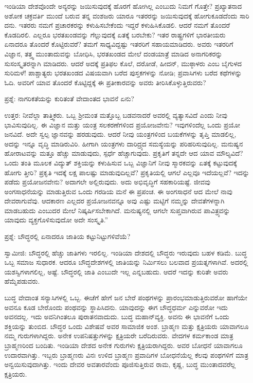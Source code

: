 ಇಂಡಿಯಾ ದೇಶವೊಂದೇ ಅನ್ಯರನ್ನು ಜಯಿಸುವುದಕ್ಕೆ ಹೊರಗೆ ಹೋಗಿಲ್ಲ ಎಂಬುದು ನಿಮಗೆ ಗೊತ್ತೇ? ಪ್ರಖ್ಯಾತನಾದ ಅಶೋಕ ಚಕ್ರವರ್ತಿ ಮುಂದೆ ಬರುವ ತನ್ನ ವಂಶಜರು ಯಾರೂ ಇತರರನ್ನು ಜಯಿಸುವುದಕ್ಕೆ ಹೋಗುಕೂಡದೆಂದು ಸಾರಿ ದನು. ಇತರರು ನಮಗೆ ಪ್ರಚಾರಕರನ್ನು ಕಳುಹಿಸಬೇಕೆಂದು ಇದ್ದರೆ ಕಳುಹಿಸಿಕೊಡಲಿ. ಆದರೆ ನಮಗೆ ತೊಂದರೆ ಕೊಡದಿರಲಿ. ಎಲ್ಲರೂ ಭರತಖಂಡವನ್ನು ಗೆಲ್ಲುವುದಕ್ಕೆ ಏತಕ್ಕೆ ಬರಬೇಕು? ಇತರ ರಾಷ್ಟ್ರಗಳಿಗೆ ಭಾರತೀಯರು ಏನಾದರೂ ತೊಂದರೆ ಕೊಟ್ಟಿರುವರೆ? ತಮಗೆ ಸಾಧ್ಯವಿದ್ದಷ್ಟು ಇತರರಿಗೆ ಸಹಾಯಮಾಡಿದರು. ಅವರು ಇತರರಿಗೆ ವಿಜ್ಞಾನ, ತತ್ತ್ವ ಮುಂತಾದುವನ್ನು ಬೋಧಿಸಿ, ಭರತಖಂಡದ ಮೇಲೆ ದಂಡಯಾತ್ರೆ ಮಾಡಿದ ಅನಾಗರಿಕರನ್ನು ಸುಸಂಸ್ಕೃತರನ್ನಾಗಿ ಮಾಡಿದರು. ಆದರೆ ಅದಕ್ಕೆ ಪ್ರತಿಫಲ ಕೊಲೆ, ದರೋಡೆ, ಹೀದನ್​, ಮುಠ್ಠಾಳರು ಎಂಬ ಬೈಗುಳದ ಸುರಿಮಳೆ! ಪಾಶ್ಚಾತ್ಯರು ಭರತಖಂಡದ ವಿಷಯವಾಗಿ ಬರೆದ ಪುಸ್ತಕಗಳನ್ನು ನೋಡಿ; ಪ್ರವಾಸಿಗಳು ಬರೆದ ಕಥೆಗಳನ್ನು ಓದಿ. ಅವರಿಗೆ ಯಾವ ತೊಂದರೆ ಕೊಟ್ಟಿದ್ದಕ್ಕೆ ಈ ಪ್ರತೀಕಾರವನ್ನು ಅವರು ತೀರಿಸಿಕೊಳ್ಳುತ್ತಿರುವರು?

ಪ್ರಶ್ನೆ: ನಾಗರಿಕತೆಯನ್ನು ಕುರಿತಂತೆ ವೇದಾಂತದ ಭಾವನೆ ಏನು?

ಉತ್ತರ: ನೀವೆಲ್ಲಾ ತಾತ್ತ್ವಿಕರು. ಒಬ್ಬ ಶ‍್ರೀಮಂತ ಮತ್ತೊಬ್ಬ ಬಡವನಾದರೆ ಅವರಲ್ಲಿ ವ್ಯತ್ಯಾಸವಿದೆ ಎಂದು ನೀವು ಭಾವಿಸುವುದಿಲ್ಲ. ಈ ವಿಜ್ಞಾನ ಮತ್ತು ಯಂತ್ರ ಸಲಕರಣೆಗಳಿಂದ ಪ್ರಯೋಜವೇನು? ಇವುಗಳಿಂದೆಲ್ಲ ಒಂದು ಪ್ರಯೋ ಜನವಿದೆ. ಅದೇ ಸ್ವಲ್ಪ ಜ್ಞಾನವನ್ನು ಹರಡುವುದು. ಆದರೆ ನೀವು ಯಂತ್ರಗಳಿಂದ ಬಯಕೆಗಳನ್ನು ತೃಪ್ತಿ ಮಾಡಲಿಲ್ಲ, ಅದನ್ನು ಇನ್ನೂ ವೃದ್ಧಿ ಮಾಡಿರುವಿರಿ. ಹೀಗಾಗಿ ಯಂತ್ರಗಳು ದಾರಿದ್ರ್ಯದ ಸಮಸ್ಯೆಯನ್ನು ಪರಿಹರಿಸುವುದಿಲ್ಲ. ಮನುಷ್ಯನ ಹೋರಾಟವನ್ನು ಮತ್ತೂ ಹೆಚ್ಚು ಮಾಡುವುದು, ಸ್ಪರ್ಧೆ ಹೆಚ್ಚಾಗುವುದು. ಪ್ರಕೃತಿಗೆ ತನ್ನದೇ ಆದ ಯಾವ ಮೌಲ್ಯವಿದೆ? ಒಂದು ತಂತಿ ಮೂಲಕ ವಿದ್ಯುತ್​ ಶಕ್ತಿಯನ್ನು ಕಳುಹಿಸುವ ಒಬ್ಬ ವಿಜ್ಞಾನಿಗೆ ನೀವು ಸ್ಮಾರಕವನ್ನು ಏತಕ್ಕೆ ಕಟ್ಟುವುದಕ್ಕೆ ಹೋಗು ತ್ತೀರಿ? ಪ್ರಕೃತಿ ಇದಕ್ಕೆ ಲಕ್ಷ ಪಾಲಷ್ಟು ಮಾಡುವುದಿಲ್ಲವೆ? ಪ್ರಕೃತಿಯಲ್ಲಿ ಆಗಲೆ ಎಲ್ಲವೂ ಇದೆಯಲ್ಲವೆ? ಇದನ್ನು ಪಡೆದು ಪ್ರಯೋಜನವೇನು? ಅದಾಗಲೇ ಅಲ್ಲಿರುವುದು. ಅದು ಅಭಿವೃದ್ಧಿಗೆ ಸಹಕಾರಿಯಷ್ಟೆ. ಜೀವವು ಅಂಗಸಾಧನೆಯನ್ನು ಮಾಡುತ್ತಿರುವ ಒಂದು ಗರಡಿಯ ಮನೆ ಈ ಪ್ರಪಂಚ. ಈ ಅಂಗಸಾಧನೆ ಆದ ಮೇಲೆ ನಾವು ದೇವರಾಗುವೆವು. ಆದಕಾರಣ ಎಲ್ಲದರ ಪ್ರಯೋಜನವನ್ನೂ ಅವು ಎಷ್ಟು ಮಟ್ಟಿಗೆ ನಮ್ಮನ್ನು ದೇವತೆಗಳನ್ನಾಗಿ ಮಾಡಬಹುದು ಎಂಬುದರ ಮೇಲೆ ನಿಷ್ಕರ್ಷಿಸಬೇಕಾಗಿದೆ. ಮನುಷ್ಯನಲ್ಲಿ ಆಗಲೇ ಸುಪ್ತವಾಗಿರುವ ಪಾವಿತ್ರ್ಯವನ್ನು ಯಾವುದು ವ್ಯಕ್ತಗೊಳಿಸುವುದೋ ಅದೇ ಸಂಸ್ಕೃತಿ.”

ಪ್ರಶ್ನೆ: ಬೌದ್ಧರಲ್ಲಿ ಏನಾದರೂ ಜಾತಿಯ ಕಟ್ಟುನಿಟ್ಟುಗಳಿವೆಯೆ?

ಸ್ವಾಮೀಜಿ: ಬೌದ್ಧರಲ್ಲಿ ಹೆಚ್ಚು ಜಾತಿಗಳು ಇರಲಿಲ್ಲ. ಇಂಡಿಯಾ ದೇಶದಲ್ಲಿ ಬೌದ್ಧರು ಇರುವುದು ಬಹಳ ಕಡಿಮೆ. ಬುದ್ಧ ಒಬ್ಬ ಸಮಾಜ ಸುಧಾರಕ. ಆದರೂ ಬೌದ್ಧದೇಶಗಳಲ್ಲಿ ಜಾತಿಯನ್ನು ನಿರ್ಮಿಸಲು ಬಲವಾದ ಪ್ರಯತ್ನಗಳಾಗಿವೆ. ಅದರಲ್ಲಿ ಯಶಸ್ವಿಗಳಾಗಲಿಲ್ಲ, ಅಷ್ಟೆ. ಬೌದ್ಧರಲ್ಲಿ ಜಾತಿ ಎಂಬುದೇ ಇಲ್ಲ ಎನ್ನಬಹುದು. ಆದರೆ ಇದನ್ನು ಕುರಿತೇ ಅವರು ಹೆಮ್ಮೆಪಡುವರು.

ಬುದ್ಧ ವೇದಾಂತ ಸನ್ಯಾಸಿಗಳಲ್ಲಿ ಒಬ್ಬ. ಈಚೆಗೆ ಹೇಗೆ ಜನ ಬೇರೆ ಪಂಥಗಳನ್ನು ಪ್ರಾರಂಭಮಾಡುತ್ತಿರುವರೋ ಹಾಗೆಯೇ ಅವನೂ ಕೂಡ ಬೇರೊಂದು ಪಂಥವನ್ನು ಸ್ಥಾಪಿಸಿದನು. ಯಾವುದನ್ನು ಈಗ ಬೌದ್ಧಧರ್ಮ ಎನ್ನುವರೋ ಇದು ಅವನದಲ್ಲ. ಇದು ಅವನಿಗಿಂತಲೂ ಪುರಾತನವಾದುದು. ಬುದ್ಧ ಮಹಾನ್​ವ್ಯಕ್ತಿ. ಅವನು ಈ ಭಾವನೆಗೆ ಒಂದು ಶಕ್ತಿಯನ್ನು ತುಂಬಿದ. ಬೌದ್ಧರ ಒಂದು ವಿಶೇಷವೆ ಅವರ ಸಾಮಾಜಿಕ ಅಂಶ. ಬ್ರಾಹ್ಮಣ ಮತ್ತು ಕ್ಷತ್ರಿಯರು ಯಾವಾಗಲೂ ನಮ್ಮ ಗುರುಗಳಾಗಿದ್ದರು. ಅನೇಕ ಉಪನಿಷತ್ತುಗಳನ್ನು ಕ್ಷತ್ರಿಯರೇ ಬರೆದಿರುವರು. ವೇದಗಳ ಕರ್ಮಕಾಂಡ ಮಾತ್ರ ಬ್ರಾಹ್ಮಣರಿಂದ ಬಂದಿತು. ಇಂಡಿಯಾ ದೇಶದ ಅನೇಕ ಗುರುಗಳು ಕ್ಷತ್ರಿಯರಾಗಿದ್ದರು. ಅವರ ಬೋಧನೆ ಯಾವಾಗಲೂ ಉದಾರವಾಗಿತ್ತು. ಇಬ್ಬರು ಬ್ರಾಹ್ಮಣರು ವಿನಃ ಉಳಿದ ಬ್ರಾಹ್ಮಣ ಪ್ರವಾದಿಗಳ ಬೋಧನೆಯೆಲ್ಲ ಕೆಲವು ಪಂಥಗಳಿಗೆ ಮಾತ್ರ ಅನ್ವಯಿಸುವುದಾಗಿತ್ತು. ಇಂದು ದೇವರ ಅವತಾರವೆಂದು ಪೂಜಿಸುತ್ತಿರುವ ರಾಮ, ಕೃಷ್ಣ, ಬುದ್ಧ ಮುಂತಾದವರೆಲ್ಲ ಕ್ಷತ್ರಿಯರು.

